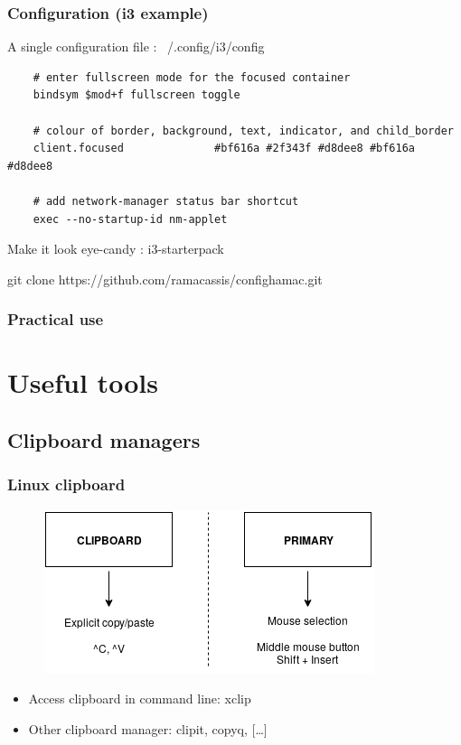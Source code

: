 \documentclass[aspectratio=169]{beamer}
\begin{document}
\begin{frame}[fragile]
    \frametitle{Configuration (i3 example)}
    A single configuration file :  ~/.config/i3/config
    \begin{lstlisting}
    # enter fullscreen mode for the focused container
    bindsym $mod+f fullscreen toggle

    # colour of border, background, text, indicator, and child_border
    client.focused              #bf616a #2f343f #d8dee8 #bf616a #d8dee8

    # add network-manager status bar shortcut
    exec --no-startup-id nm-applet
    \end{lstlisting}

    Make it look eye-candy : i3-starterpack \newline

    git clone https://github.com/ramacassis/confighamac.git
\end{frame}

\begin{frame}
  \frametitle{Practical use}
    \begin{center}
    \end{center}
\end{frame}

\section{Useful tools}
\subsection{Clipboard managers}

\begin{frame}
    \frametitle{Linux clipboard}
    \begin{figure}[h]
        \includegraphics[scale=0.6]{./images/linux_clipboard.png}
    \end{figure}
    \begin{itemize}
    \item Access clipboard in command line: xclip
    \item Other clipboard manager: clipit, copyq, […]
    \end{itemize}
\end{frame}
\end{document}
